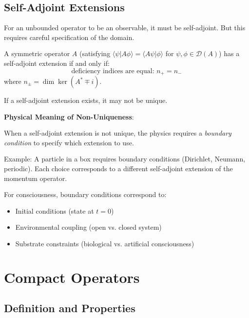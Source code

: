 \subsection{Self-Adjoint Extensions}

For an unbounded operator to be an observable, it must be self-adjoint. But this requires careful specification of the domain.

\begin{theorem}\label{thm:self-adjoint-extension}
A symmetric operator $A$ (satisfying $\langle \psi | A\phi \rangle = \langle A\psi | \phi \rangle$ for $\psi, \phi \in \mathcal{D}(A)$) has a self-adjoint extension if and only if:
\begin{equation}
\text{deficiency indices are equal: } n_+ = n_-
\end{equation}
where $n_\pm = \dim \ker(A^* \mp i)$.

If a self-adjoint extension exists, it may not be unique.
\end{theorem}

\begin{level2}
\textbf{Physical Meaning of Non-Uniqueness}:

When a self-adjoint extension is not unique, the physics requires a \textit{boundary condition} to specify which extension to use.

Example: A particle in a box requires boundary conditions (Dirichlet, Neumann, periodic). Each choice corresponds to a different self-adjoint extension of the momentum operator.

For consciousness, boundary conditions correspond to:
\begin{itemize}
\item Initial conditions (state at $t=0$)
\item Environmental coupling (open vs. closed system)
\item Substrate constraints (biological vs. artificial consciousness)
\end{itemize}
\end{level2}

\section{Compact Operators}

\subsection{Definition and Properties}

